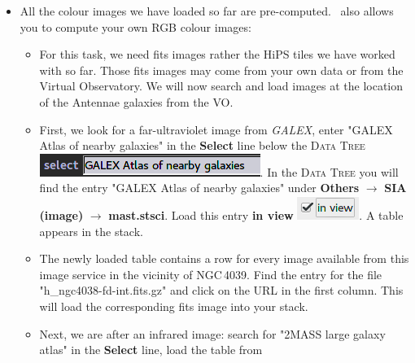 \documentclass [a4paper, 12pt]{article}
\begin{document}
\begin{itemize}
    \item All the colour images we have loaded so far are pre-computed.
\aladin\ also allows you to compute your own RGB colour images:
     \begin{itemize}
         \item For this task, we need fits images rather the HiPS tiles we have
         worked with so far. Those fits images may come from your own data or
         from the Virtual Observatory. We will now search and load images at
         the location of the Antennae galaxies from the VO.
         \item First, we look for a far-ultraviolet image from
         \textit{GALEX}, enter "GALEX Atlas of nearby galaxies" in the
         \textbf{Select} line below the
         \textsc{Data Tree} \includegraphics[width=0.17
         \textwidth]{../images/aladin_select_GALEX.png}. In the \textsc{Data
         Tree} you will find the entry "GALEX Atlas of nearby galaxies" under
         \textbf{Others} $\rightarrow$ \textbf{SIA (image)} $\rightarrow$
         \textbf{mast.stsci}. Load this entry \textbf{in view}
         \includegraphics[width=0.07
         \textwidth]{../images/aladin_load_inview.png}. A table appears in the
         stack.
         \item The newly loaded table contains a row for every image available
         from this image service in the vicinity of NGC\,4039. Find the entry
         for the file "h\_ngc4038-fd-int.fits.gz" and click on the URL in the
         first column. This will load the corresponding fits image into your
         stack.
         \item Next, we are after an infrared image: search for "2MASS large
         galaxy atlas" in the \textbf{Select} line, load the table from

\end{itemize}
\end{itemize}
\end{document}
